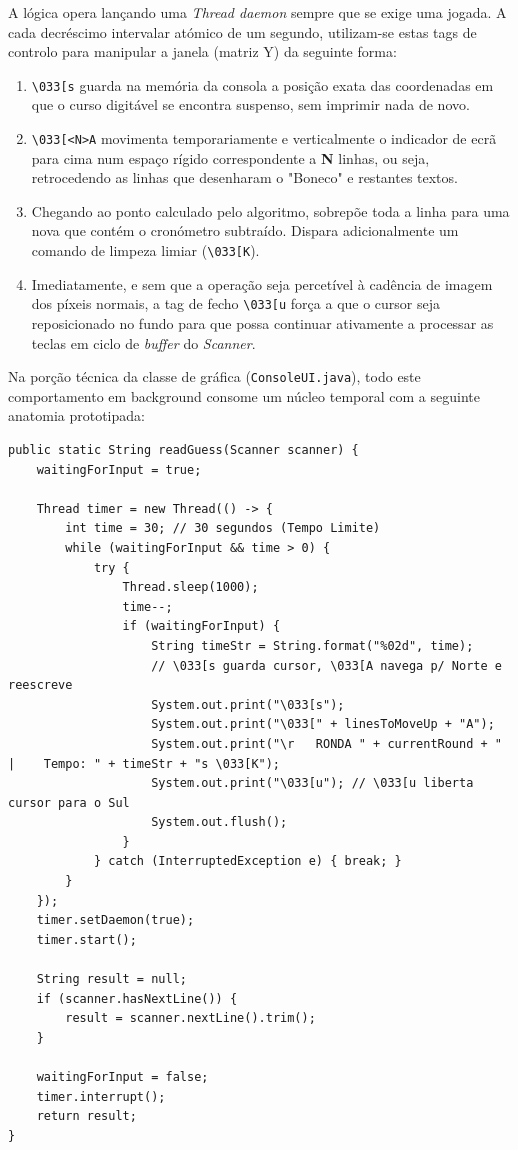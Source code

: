 \documentclass[11pt,a4paper,oneside]{report}
\begin{document}
A lógica opera lançando uma \textit{Thread daemon} sempre que se exige uma jogada. A cada decréscimo intervalar atómico de um segundo, utilizam-se estas tags de controlo para manipular a janela (matriz Y) da seguinte forma:
\begin{enumerate}
    \item \texttt{\textbackslash033[s} guarda na memória da consola a posição exata das coordenadas em que o curso digitável se encontra suspenso, sem imprimir nada de novo.
    \item \texttt{\textbackslash033[<N>A} movimenta temporariamente e verticalmente o indicador de ecrã para cima num espaço rígido correspondente a \textbf{N} linhas, ou seja, retrocedendo as linhas que desenharam o "Boneco" e restantes textos.
    \item Chegando ao ponto calculado pelo algoritmo, sobrepõe toda a linha para uma nova que contém o cronómetro subtraído. Dispara adicionalmente um comando de limpeza limiar (\texttt{\textbackslash033[K}).
    \item Imediatamente, e sem que a operação seja percetível à cadência de imagem dos píxeis normais, a tag de fecho \texttt{\textbackslash033[u} força a que o cursor seja reposicionado no fundo para que possa continuar ativamente a processar as teclas em ciclo de \textit{buffer} do \textit{Scanner}.
\end{enumerate}

Na porção técnica da classe de gráfica (\texttt{ConsoleUI.java}), todo este comportamento em background consome um núcleo temporal com a seguinte anatomia prototipada:

\begin{lstlisting}[caption={Rotina Assíncrona de Input com Relógio ANSI em Segundo Plano}]
public static String readGuess(Scanner scanner) {
    waitingForInput = true;
    
    Thread timer = new Thread(() -> {
        int time = 30; // 30 segundos (Tempo Limite)
        while (waitingForInput && time > 0) {
            try {
                Thread.sleep(1000);
                time--;
                if (waitingForInput) {
                    String timeStr = String.format("%02d", time);
                    // \033[s guarda cursor, \033[A navega p/ Norte e reescreve 
                    System.out.print("\033[s"); 
                    System.out.print("\033[" + linesToMoveUp + "A");
                    System.out.print("\r   RONDA " + currentRound + "   |    Tempo: " + timeStr + "s \033[K");
                    System.out.print("\033[u"); // \033[u liberta cursor para o Sul
                    System.out.flush();
                }
            } catch (InterruptedException e) { break; }
        }
    });
    timer.setDaemon(true);
    timer.start();

    String result = null;
    if (scanner.hasNextLine()) {
        result = scanner.nextLine().trim();
    }
    
    waitingForInput = false;
    timer.interrupt();
    return result;
}
\end{lstlisting}
\end{document}
